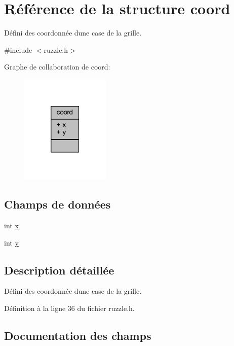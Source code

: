 \hypertarget{structcoord}{}\section{Référence de la structure coord}
\label{structcoord}


Défini des coordonnée d\textquotesingle{}une case de la grille.  




{\ttfamily \#include $<$ruzzle.\+h$>$}



Graphe de collaboration de coord\+:
\nopagebreak
\begin{figure}[H]
\begin{center}
\leavevmode
\includegraphics[width=121pt]{d9/d49/structcoord__coll__graph}
\end{center}
\end{figure}
\subsection*{Champs de données}
\begin{DoxyCompactItemize}
\item 
int \hyperlink{structcoord_a6150e0515f7202e2fb518f7206ed97dc}{x}
\item 
int \hyperlink{structcoord_a0a2f84ed7838f07779ae24c5a9086d33}{y}
\end{DoxyCompactItemize}


\subsection{Description détaillée}
Défini des coordonnée d\textquotesingle{}une case de la grille. 

Définition à la ligne 36 du fichier ruzzle.\+h.



\subsection{Documentation des champs}
\hypertarget{structcoord_a6150e0515f7202e2fb518f7206ed97dc}{}
